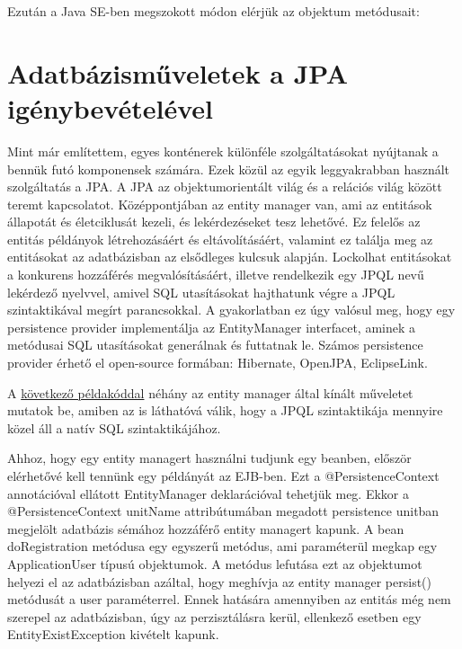 \documentclass[centeredchapter]{thesis-ekf}
\theoremstyle{definition}
\theoremstyle{remark}
\begin{document}
\hypertarget{figure-inject}{}


Ezután a Java SE-ben megszokott módon \hypertarget{figure-method-call}{elérjük} az objektum metódusait:

\hypertarget{figure-method-call}{}


\section{Adatbázisműveletek a JPA igénybevételével}

Mint már említettem, egyes konténerek különféle szolgáltatásokat nyújtanak a bennük futó komponensek számára. Ezek közül az egyik leggyakrabban használt szolgáltatás a JPA.
A JPA az objektumorientált világ és a relációs világ között teremt kapcsolatot. Középpontjában az entity manager van, ami az entitások állapotát és életciklusát kezeli, és lekérdezéseket tesz lehetővé. Ez felelős az entitás példányok létrehozásáért és eltávolításáért, valamint ez találja meg az entitásokat az adatbázisban az elsődleges kulcsuk alapján. Lockolhat entitásokat a konkurens hozzáférés megvalósításáért, illetve rendelkezik egy JPQL nevű lekérdező nyelvvel, amivel SQL  utasításokat hajthatunk végre a JPQL szintaktikával megírt parancsokkal. A gyakorlatban ez úgy valósul meg, hogy egy persistence provider implementálja az EntityManager interfacet, aminek a metódusai SQL utasításokat generálnak és futtatnak le. Számos persistence provider érhető el open-source formában: Hibernate, OpenJPA, EclipseLink.

A \hyperlink{figure-entitymanager}{következő példakóddal} néhány az entity manager által kínált műveletet mutatok be, amiben az is láthatóvá válik, hogy a JPQL szintaktikája mennyire közel áll a natív SQL szintaktikájához.

\newpage
\hypertarget{figure-entitymanager}{}


Ahhoz, hogy egy entity managert használni tudjunk egy beanben, először elérhetővé kell tennünk egy példányát az EJB-ben. Ezt a @PersistenceContext annotációval ellátott EntityManager deklarációval tehetjük meg. Ekkor a @PersistenceContext unitName attribútumában megadott persistence unitban megjelölt adatbázis sémához hozzáférő entity managert kapunk. A bean doRegistration metódusa egy egyszerű metódus, ami paraméterül megkap egy ApplicationUser típusú objektumok. A metódus lefutása ezt az objektumot helyezi el az adatbázisban azáltal, hogy meghívja az entity manager persist() metódusát a user paraméterrel. Ennek hatására amennyiben az entitás még nem szerepel az adatbázisban, úgy az perzisztálásra kerül, ellenkező esetben egy EntityExistException kivételt kapunk.
\end{document}

